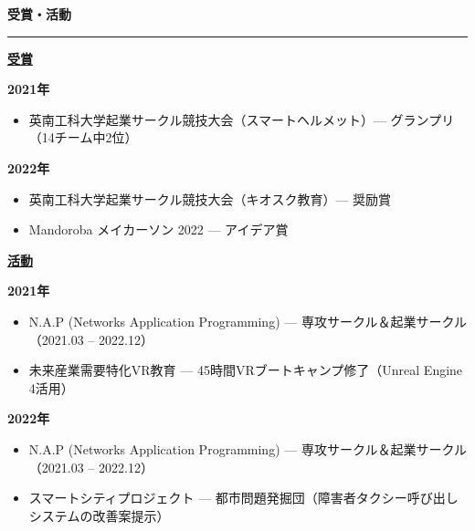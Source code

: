 \documentclass[a4paper, 10pt]{article}
\newcommand{\resumesection}[1]{%
  \vspace{8pt}
  \noindent
  {\large\bfseries #1}
  \vspace{2pt}
  \noindent\hrule
  \vspace{4pt}
}
\begin{document}
\resumesection{\japanesefont 受賞・活動}

\vspace{2pt}
\noindent
\textbf{\underline{\japanesefont 受賞}}

\vspace{2pt}
\noindent
\textbf{\japanesefont 2021年}

\begin{itemize}
  \setlength{\itemsep}{1pt}
  \setlength{\parskip}{0pt}
  \item \japanesefont 英南工科大学起業サークル競技大会（スマートヘルメット）— グランプリ（14チーム中2位）
\end{itemize}

\vspace{2pt}
\noindent
\textbf{\japanesefont 2022年}

\begin{itemize}
  \setlength{\itemsep}{1pt}
  \setlength{\parskip}{0pt}
  \item \japanesefont 英南工科大学起業サークル競技大会（キオスク教育）— 奨励賞
  \item \japanesefont Mandoroba メイカーソン 2022 — アイデア賞
\end{itemize}

\vspace{4pt}
\noindent
\textbf{\underline{\japanesefont 活動}}

\vspace{2pt}
\noindent
\textbf{\japanesefont 2021年}

\begin{itemize}
  \setlength{\itemsep}{1pt}
  \setlength{\parskip}{0pt}
  \item \japanesefont N.A.P (Networks Application Programming) — 専攻サークル＆起業サークル（2021.03 -- 2022.12）
  \item \japanesefont 未来産業需要特化VR教育 — 45時間VRブートキャンプ修了（Unreal Engine 4活用）
\end{itemize}

\vspace{2pt}
\noindent
\textbf{\japanesefont 2022年}

\begin{itemize}
  \setlength{\itemsep}{1pt}
  \setlength{\parskip}{0pt}
  \item \japanesefont N.A.P (Networks Application Programming) — 専攻サークル＆起業サークル（2021.03 -- 2022.12）
  \item \japanesefont スマートシティプロジェクト — 都市問題発掘団（障害者タクシー呼び出しシステムの改善案提示）
\end{itemize}
\end{document}
